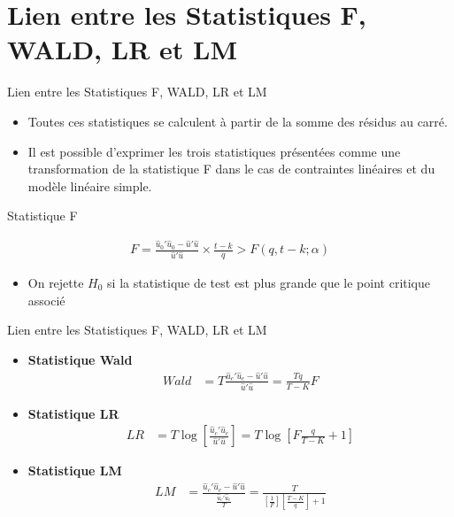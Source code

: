\documentclass{beamer}
\begin{document}
\section{Lien entre les Statistiques F, WALD, LR et LM}

\frame{\tableofcontents[current]}

\begin{frame}{Lien entre les Statistiques F, WALD, LR et LM}
\begin{itemize}
\item Toutes ces statistiques se calculent à partir de la somme des résidus au carré.
\item Il est possible d’exprimer les trois statistiques présentées comme une transformation de la statistique F dans le cas de contraintes linéaires et du modèle linéaire simple.
\end{itemize}
\begin{block}{Statistique F}

\begin{align*}
F= \frac{\hat{u}_0'\hat{u}_0-\hat{u}'\hat{u}}{\hat{u}'\hat{u}} \times \frac{t-k}{q}>F(q,t-k;\alpha) 
\end{align*}
\begin{itemize}
\item On rejette $H_0$ si la statistique de test est plus grande que le point critique associé
\end{itemize}
\end{block}
\end{frame}

\begin{frame}{Lien entre les Statistiques F, WALD, LR et LM}
    \begin{itemize}
        \item \textbf{Statistique Wald}
        \begin{align*}
            Wald &= T \frac{\hat{u}_c'\hat{u}_c - \hat{u}'\hat{u}}{\hat{u}'\hat{u}} = \frac{Tq}{T-K}F
        \end{align*}

        \item \textbf{Statistique LR}
        \begin{align*}
            LR &= T \log \left[ \frac{\hat{u}_c'\hat{u}_c}{\hat{u}'\hat{u}} \right] = T \log \left[F \frac{q}{T-K} + 1 \right]
        \end{align*}

        \item \textbf{Statistique LM}
        \begin{align*}
            LM &= \frac{\hat{u}_c'\hat{u}_c - \hat{u}'\hat{u}}{\frac{\hat{u}_c'\hat{u}_c}{T}} = \frac{T}{\left[\frac{1}{F}\right] \left[\frac{T-K}{q}\right] + 1}
        \end{align*}
    \end{itemize}
\end{frame}
\end{document}
